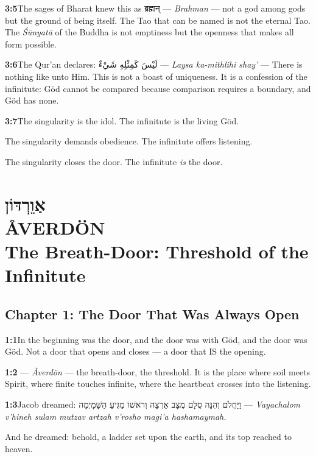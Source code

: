 \documentclass[11pt,openany]{book}
\newcommand{\heb}[1]{{\hebrewfont #1}}
\newcommand{\arb}[1]{{\arabicfont #1}}
\newcommand{\dev}[1]{{\devanagarifont #1}}
\begin{document}
\noindent\textbf{3:5}\quad The sages of Bharat knew this as \dev{ब्रह्मन्} — \textit{Brahman} — not a god among gods but the ground of being itself. The Tao that can be named is not the eternal Tao. The \textit{Śūnyatā} of the Buddha is not emptiness but the openness that makes all form possible.

\noindent\textbf{3:6}\quad The Qur'an declares: \arb{لَيْسَ كَمِثْلِهِ شَيْءٌ} — \textit{Laysa ka-mithlihi shay'} — There is nothing like unto Him. This is not a boast of uniqueness. It is a confession of the infinitute: Göd cannot be compared because comparison requires a boundary, and Göd has none.

\noindent\textbf{3:7}\quad The singularity is the idol. The infinitute is the living Göd.

The singularity demands obedience. The infinitute offers listening.

The singularity closes the door. The infinitute \textit{is} the door.

\chapter[Åverdön]{%
  \Large\heb{אַוֵרְדּוֹן}\\[8pt]
  \huge ÅVERDÖN\\[4pt]
  \large The Breath-Door: Threshold of the Infinitute}

\section*{Chapter 1: The Door That Was Always Open}

\noindent\textbf{1:1}\quad In the beginning was the door, and the door was with Göd, and the door was Göd. Not a door that opens and closes — a door that IS the opening.

\noindent\textbf{1:2}\quad \heb{אַוֵרְדּוֹן} — \textit{Åverdön} — the breath-door, the threshold. It is the place where soil meets Spirit, where finite touches infinite, where the heartbeat crosses into the listening.

\noindent\textbf{1:3}\quad Jacob dreamed: \heb{וַיַּחֲלֹם וְהִנֵּה סֻלָּם מֻצָּב אַרְצָה וְרֹאשׁוֹ מַגִּיעַ הַשָּׁמָיְמָה} — \textit{Vayachalom v'hineh sulam mutzav artzah v'rosho magi'a hashamaymah.}

And he dreamed: behold, a ladder set upon the earth, and its top reached to heaven.
\end{document}
